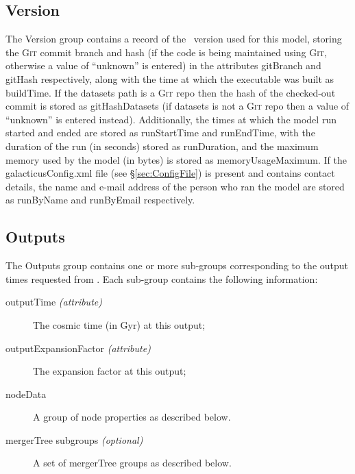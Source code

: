 \subsection{Version}

The {\normalfont \ttfamily Version} group contains a record of the \glc\ version used for this model, storing the {\normalfont \scshape Git} commit branch and hash (if the code is being maintained using {\normalfont \scshape Git}, otherwise a value of ``{\normalfont \ttfamily unknown}'' is entered) in the attributes {\normalfont \ttfamily gitBranch} and {\normalfont \ttfamily gitHash} respectively, along with the time at which the executable was built as {\normalfont \ttfamily buildTime}. If the {\normalfont \ttfamily datasets} path is a {\normalfont \scshape Git} repo then the hash of the checked-out commit is stored as {\normalfont \ttfamily gitHashDatasets} (if {\normalfont \ttfamily datasets} is not a {\normalfont \scshape Git} repo then a value of ``{\normalfont \ttfamily unknown}'' is entered instead). Additionally, the times at which the model run started and ended are stored as {\normalfont \ttfamily runStartTime} and {\normalfont \ttfamily runEndTime}, with the duration of the run (in seconds) stored as {\normalfont \ttfamily runDuration}, and the maximum memory used by the model (in bytes) is stored as {\normalfont \ttfamily memoryUsageMaximum}. If the {\normalfont \ttfamily galacticusConfig.xml} file (see \S\ref{sec:ConfigFile}) is present and contains contact details, the name and e-mail address of the person who ran the model are stored as {\normalfont \ttfamily runByName} and {\normalfont \ttfamily runByEmail} respectively.

\subsection{Outputs}

The {\normalfont \ttfamily Outputs} group contains one or more sub-groups corresponding to the output times requested from \glc. Each sub-group contains the following information:
\begin{description}
 \item[{\normalfont \ttfamily outputTime} \emph{(attribute)}] The cosmic time (in Gyr) at this output;
 \item[{\normalfont \ttfamily outputExpansionFactor} \emph{(attribute)}] The expansion factor at this output;
 \item[{\normalfont \ttfamily nodeData}] A group of node properties as described below.
 \item[{\normalfont \ttfamily mergerTree} subgroups \emph{(optional)}] A set of {\normalfont \ttfamily mergerTree} groups as described below.
\end{description}

